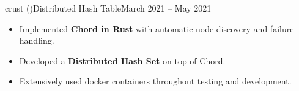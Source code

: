 \begin{cvsubsection}{crust \normalfont(\href{ https://github.com/a3y3/crust}{})}{Distributed Hash Table}{March 2021 -- May 2021}
	\begin{itemize}
        \item Implemented \textbf{Chord in Rust} with automatic node discovery and failure handling.
        \item Developed a \textbf{Distributed Hash Set} on top of Chord.
        \item Extensively used docker containers throughout testing and development.
	\end{itemize}
\end{cvsubsection}